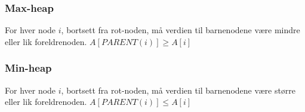 \subsubsection{Max-heap}
For hver node $i$, bortsett fra rot-noden, må verdien til barnenodene være mindre eller lik foreldrenoden. $A[PARENT(i)]\geq A[i]$

\subsubsection{Min-heap}
For hver node $i$, bortsett fra rot-noden, må verdien til barnenodene være større eller lik foreldrenoden. $A[PARENT(i)]\leq A[i]$



